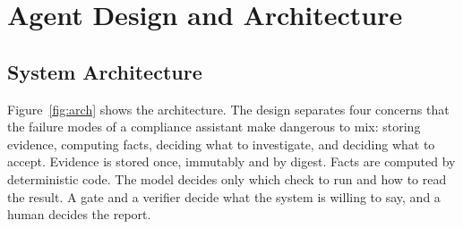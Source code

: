 \chapter{Agent Design and Architecture}
\label{ch:design}

\section{System Architecture}
Figure~\ref{fig:arch} shows the architecture. The design separates four concerns that the failure modes of
a compliance assistant make dangerous to mix: storing evidence, computing facts, deciding what to
investigate, and deciding what to accept. Evidence is stored once, immutably and by digest. Facts are
computed by deterministic code. The model decides only which check to run and how to read the result.
A gate and a verifier decide what the system is willing to say, and a human decides the report.

